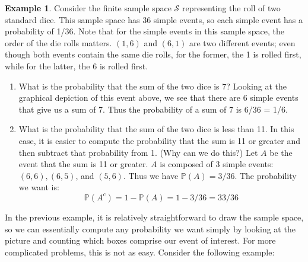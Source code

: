 \documentclass[12pt]{article}
\theoremstyle{definition}
\newtheorem*{example}{Example}
\theoremstyle{remark}
\def\P{{\mathbb P}}
\def\cals{{\mathcal S}}
\begin{document}
\begin{example}Consider the finite sample space $\cals$ representing the roll of two standard dice. This sample space has 36 simple events, so each simple event has a probability of 1/36. Note that for the simple events in this sample space, the order of the die rolls matters. $(1, 6)$ and $(6, 1)$ are two different events; even though both events contain the same die rolls, for the former, the 1 is rolled first, while for the latter, the 6 is rolled first.
\begin{enumerate}
\item What is the probability that the sum of the two dice is 7? Looking at the graphical depiction of this event above, we see that there are 6 simple events that give us a sum of 7. Thus the probability of a sum of 7 is 6/36 = 1/6.
\item What is the probability that the sum of the two dice is less than 11. In this case, it is easier to compute the probability that the sum is 11 or greater and then subtract that probability from 1. (Why can we do this?) Let $A$ be the event that the sum is 11 or greater. $A$ is composed of 3 simple events: $(6, 6), (6, 5)$, and $(5, 6)$. Thus we have $\P(A) = 3/36$. The probability we want is:
\[
\P(A^c) = 1 - \P(A) = 1 - 3/36 = 33/36
\]
\end{enumerate}
\end{example}
In the previous example, it is relatively straightforward to draw the sample space, so we can essentially compute any probability we want simply by looking at the picture and counting which boxes comprise our event of interest. For more complicated problems, this is not as easy. Consider the following example:
\end{document}
